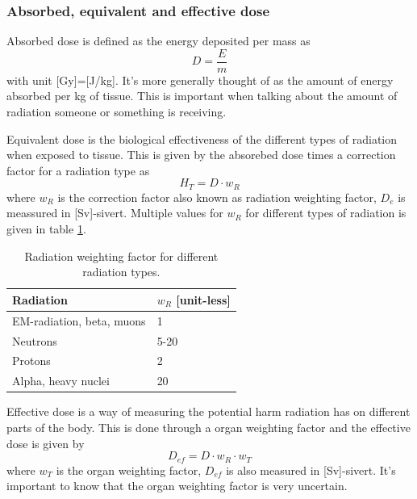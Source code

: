 \documentclass[jmp, amsmath, amssymb, reprint]{article}
\numberwithin{equation}{section}
\begin{document}
\begin{multicols}{2}
\subsubsection{Absorbed, equivalent and effective dose}

Absorbed dose is defined as the energy deposited per mass as
\begin{equation}
D=\frac{E}{m}
\end{equation}
with unit [Gy]=[J/kg]. It's more generally thought of as the amount of energy absorbed per kg of tissue. This is important when talking about the amount of radiation someone or something is receiving.

Equivalent dose is the biological effectiveness of the different types of radiation when exposed to tissue. This is given by the absorebed dose times a correction factor for a radiation type as
\begin{equation}
H_T = D\cdot w_R
\end{equation}
where \(w_R\) is the correction factor also known as radiation weighting factor, \(D_e\) is meassured in [Sv]-sivert. Multiple values for \(w_R\) for different types of radiation is given in table \ref{tabel:6}.

\begin{table}[H]
  \begin{center}
    \begin{tabular}{| l | l |}
   	\hline
	Radiation & \(w_R\) [unit-less]\\ \hline
	EM-radiation, beta, muons & 1\\
	Neutrons & 5-20\\
	Protons & 2\\
	Alpha, heavy nuclei & 20\\ \hline
	\end{tabular}
    \caption{Radiation weighting factor for different radiation types.}
    \label{tabel:6}
  \end{center}
\end{table}

Effective dose is a way of measuring the potential harm radiation has on different parts of the body. This is done through a organ weighting factor and the effective dose is given by
\begin{equation}
D_{ef}=D\cdot w_R\cdot w_T
\end{equation}
where \(w_T\) is the organ weighting factor, \(D_{ef}\) is also measured in [Sv]-sivert. It's important to know that the organ weighting factor is very uncertain.


\end{multicols}
\end{document}
